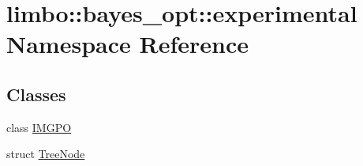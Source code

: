 \hypertarget{namespacelimbo_1_1bayes__opt_1_1experimental}{}\section{limbo\+:\+:bayes\+\_\+opt\+:\+:experimental Namespace Reference}
\label{namespacelimbo_1_1bayes__opt_1_1experimental}
\subsection*{Classes}
\begin{DoxyCompactItemize}
\item 
class \hyperlink{classlimbo_1_1bayes__opt_1_1experimental_1_1_i_m_g_p_o}{I\+M\+G\+PO}
\item 
struct \hyperlink{structlimbo_1_1bayes__opt_1_1experimental_1_1_tree_node}{Tree\+Node}
\end{DoxyCompactItemize}
